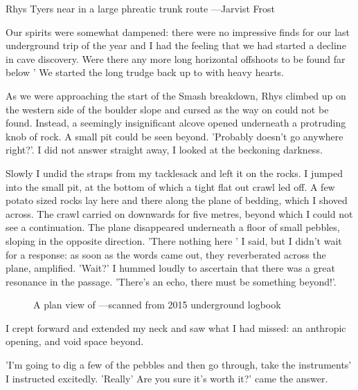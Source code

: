 \begin{marginfigure}
\checkoddpage \ifoddpage \forcerectofloat \else \forceversofloat \fi
\centering
 \caption{Rhys Tyers near  in a large phreatic trunk route ---Jarvist Frost}
 \label{near duck}
\end{marginfigure}

Our spirits were somewhat dampened: there were no impressive finds for our last underground trip of the year and I had the feeling that we had started a decline in cave discovery. Were there any more long horizontal offshoots to be found far below ' We started the long trudge back up to  with heavy hearts.

As we were approaching the start of the Smash breakdown, Rhys climbed up on the western side of the boulder slope and cursed as the way on could not be found. Instead, a seemingly insignificant alcove opened underneath a protruding knob of rock. A small pit could be seen beyond. 'Probably doesn't go anywhere right?'. I did not answer straight away, I looked at the beckoning darkness.

Slowly I undid the straps from my tacklesack and left it on the rocks. I jumped into the small  pit, at the bottom of which a tight flat out crawl led off. A few potato sized rocks lay here and there along the plane of bedding, which I shoved across. The crawl carried on downwards for five metres, beyond which I could not see a continuation. The plane disappeared underneath a floor of small pebbles, sloping in the opposite direction. 'There nothing here ' I said, but I didn't wait for a response: as soon as the words came out, they reverberated across the plane, amplified. 'Wait?' I hummed loudly to ascertain that there was a great resonance in the passage. 'There's an echo, there must be something beyond!'.


\begin{figure*}[t!]
\checkoddpage \ifoddpage \forcerectofloat \else \forceversofloat \fi
\centering
 \caption{A plan view of  ---scanned from 2015 underground logbook}
 \label{lazarus plan}
\end{figure*}
I crept forward and extended my neck and saw what I had missed: an anthropic opening, and void space beyond. 

'I'm going to dig a few of the pebbles and then go through, take the instruments' I instructed excitedly. 
'Really' Are you sure it's worth it?' came the answer. 

